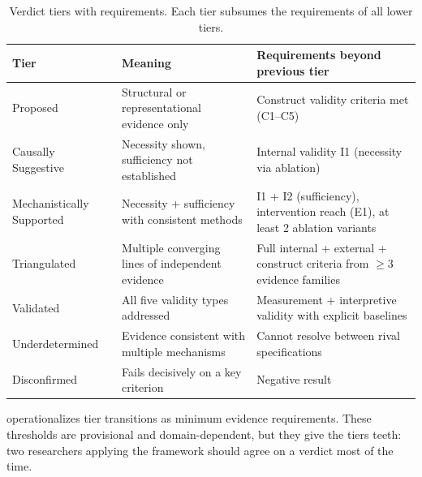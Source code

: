 \documentclass{article}
\newcommand{\tighttable}{\setlength{\tabcolsep}{4pt}\renewcommand{\arraystretch}{1.05}}
\begin{document}
\begin{table}[H]
\centering
\tighttable
\caption{Verdict tiers with requirements. Each tier subsumes the requirements of all lower tiers.}
\label{tab:verdicts}
\small
\begin{tabular}{@{}lp{4.5cm}p{5.5cm}@{}}
\toprule
\textbf{Tier} & \textbf{Meaning} & \textbf{Requirements beyond previous tier} \\
\midrule
Proposed & Structural or representational evidence only & Construct validity criteria met (C1--C5) \\
\midrule
Causally Suggestive & Necessity shown, sufficiency not established & Internal validity I1 (necessity via ablation) \\
\midrule
Mechanistically Supported & Necessity + sufficiency with consistent methods & I1 + I2 (sufficiency), intervention reach (E1), at least 2 ablation variants \\
\midrule
Triangulated & Multiple converging lines of independent evidence & Full internal + external + construct criteria from $\geq 3$ evidence families \\
\midrule
Validated & All five validity types addressed & Measurement + interpretive validity with explicit baselines \\
\midrule
Underdetermined & Evidence consistent with multiple mechanisms & Cannot resolve between rival specifications \\
\midrule
Disconfirmed & Fails decisively on a key criterion & Negative result \\
\bottomrule
\end{tabular}
\end{table}

 operationalizes tier transitions as minimum evidence requirements. These thresholds are provisional and domain-dependent, but they give the tiers teeth: two researchers applying the framework should agree on a verdict most of the time.
\end{document}
